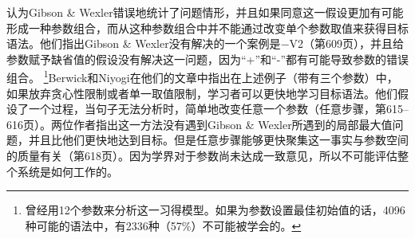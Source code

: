  \citet{BN96a}认为Gibson \& Wexler错误地统计了问题情形，并且如果同意这一假设更加有可能形成一种参数组合，而从这种参数组合中并不能通过改变单个参数取值来获得目标语法。他们指出Gibson \& Wexler没有解决的一个案例是$-$V2（第609页），并且给参数赋予缺省值的假设没有解决这一问题，因为“+”和“-”都有可能导致参数的错误组合。 \footnote{%
   \citet{Kohl99a,Kohl2000a}曾经用12个参数来分析这一习得模型。如果为参数设置最佳初始值的话，4096种可能的语法中，有2336种（57\%）不可能被学会的。
}Berwick和Niyogi在他们的文章中指出在上述例子（带有三个参数）中，如果放弃贪心性限制或者单一取值限制，学习者可以更快地学习目标语法。他们假设了一个过程，当句子无法分析时，简单地改变任意一个参数（任意步骤，第615--616页）。两位作者指出这一方法没有遇到Gibson \& Wexler所遇到的局部最大值问题，并且比他们更快地达到目标。但是任意步骤能够更快聚集这一事实与参数空间的质量有关（第618页）。因为学界对于参数尚未达成一致意见，所以不可能评估整个系统是如何工作的。

